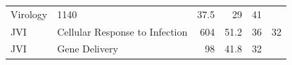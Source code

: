 \documentclass[11pt,]{article}
\begin{document}
\begin{longtable}[]{@{}llrrrr@{}}
\begin{minipage}[t]{0.43\columnwidth}
Virology\strut
\end{minipage} & \begin{minipage}[t]{0.04\columnwidth}\raggedleft\strut
1140\strut
\end{minipage} & \begin{minipage}[t]{0.08\columnwidth}\raggedleft\strut
37.5\strut
\end{minipage} & \begin{minipage}[t]{0.11\columnwidth}\raggedleft\strut
29\strut
\end{minipage} & \begin{minipage}[t]{0.11\columnwidth}\raggedleft\strut
41\strut
\end{minipage}\tabularnewline
\begin{minipage}[t]{0.06\columnwidth}\raggedright\strut
JVI\strut
\end{minipage} & \begin{minipage}[t]{0.43\columnwidth}\raggedright\strut
Cellular Response to Infection\strut
\end{minipage} & \begin{minipage}[t]{0.04\columnwidth}\raggedleft\strut
604\strut
\end{minipage} & \begin{minipage}[t]{0.08\columnwidth}\raggedleft\strut
51.2\strut
\end{minipage} & \begin{minipage}[t]{0.11\columnwidth}\raggedleft\strut
36\strut
\end{minipage} & \begin{minipage}[t]{0.11\columnwidth}\raggedleft\strut
32\strut
\end{minipage}\tabularnewline
\begin{minipage}[t]{0.06\columnwidth}\raggedright\strut
JVI\strut
\end{minipage} & \begin{minipage}[t]{0.43\columnwidth}\raggedright\strut
Gene Delivery\strut
\end{minipage} & \begin{minipage}[t]{0.04\columnwidth}\raggedleft\strut
98\strut
\end{minipage} & \begin{minipage}[t]{0.08\columnwidth}\raggedleft\strut
41.8\strut
\end{minipage} & \begin{minipage}[t]{0.11\columnwidth}\raggedleft\strut
32\strut
\end{minipage} & \begin{minipage}[t]{0.11\columnwidth}\raggedleft\strut

\end{minipage}
\end{longtable}
\end{document}
